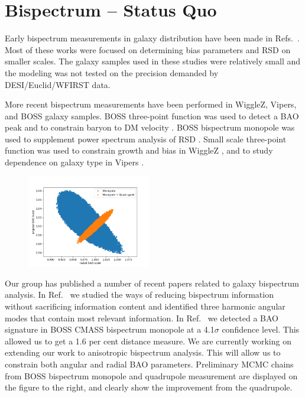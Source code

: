 \section{Bispectrum -- Status Quo}

Early bispectrum measurements in galaxy distribution have been made in
Refs.~\cite{2014ApJ...780..139G,2011ApJ...739...85M,2011ApJ...726...13M,2009MNRAS.399..801G,2007MNRAS.378.1196K,2006MNRAS.368.1507N,2005MNRAS.364..620G,2005MNRAS.361..824G,2004PASJ...56..415K,2004ApJ...607..140J,2002MNRAS.335..432V,1975ApJ...196....1P}.
Most of these works were focused on determining bias parameters and RSD on
smaller scales. The galaxy samples used in these studies were relatively small
and the modeling was not tested on the precision demanded by DESI/Euclid/WFIRST
data.

More recent bispectrum measurements have been performed in WiggleZ, Vipers, and
BOSS galaxy samples. BOSS three-point function was used to detect a BAO peak
\cite{2017MNRAS.469.1738S} and to constrain baryon to DM velocity
\cite{2016arXiv160706098S}. BOSS bispectrum monopole was used to supplement
power spectrum analysis of RSD
\cite{2017MNRAS.465.1757G,2015MNRAS.452.1914G,2015MNRAS.451..539G}. Small scale
three-point function was used to constrain growth and bias in WiggleZ
\cite{2013MNRAS.432.2654M}, and to study dependence on galaxy type in Vipers
\cite{2017A&A...604A.133M}.

\begin{figure}
\begin{center}
\includegraphics[width=0.48\textwidth]{prelimMCMC.png}
\end{center}
\end{figure}

Our group has published a number of recent papers related to galaxy bispectrum
analysis. In Ref.~\cite{2017MNRAS.467..928G} we studied the ways of reducing
bispectrum information without sacrificing information content and identified
three harmonic angular modes that contain most relevant information. In
Ref.~\cite{2018MNRAS.478.4500P} we detected a BAO signature in BOSS CMASS
bispectrum monopole at a 4.1$\sigma$ confidence level. This allowed us to
get a 1.6 per cent distance measure. We are currently working on extending our
work to anisotropic bispectrum analysis. This will allow us to constrain both
angular and radial BAO parameters. Preliminary MCMC chains from BOSS bispectrum
monopole and quadrupole measurement are displayed on the figure to the right,
and clearly show the improvement from the quadrupole.

